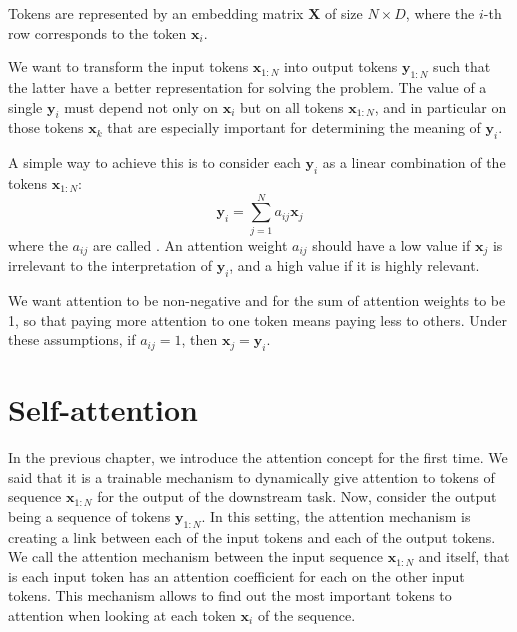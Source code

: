 Tokens are represented by an embedding matrix $\mathbf{X}$ of size $N \times D$, where the $i$-th row corresponds to the token $\mathbf{x}_{i}$.

We want to transform the input tokens $\mathbf{x}_{1:N}$ into output tokens $\mathbf{y}_{1:N}$ such that the latter have a better representation for solving the problem. The value of a single $\mathbf{y}_i$ must depend not only on $\mathbf{x}_i$ but on all tokens $\mathbf{x}_{1:N}$, and in particular on those tokens $\mathbf{x}_{k}$ that are especially important for determining the meaning of $\mathbf{y}_i$.

A simple way to achieve this is to consider each $\mathbf{y}_i$ as a linear combination of the tokens $\mathbf{x}_{1:N}$:
\[
\mathbf{y}_{i}=\sum^{N}_{j=1}a_{ij}\mathbf{x}_{j}
\]
where the $a_{ij}$ are called . An attention weight $a_{ij}$ should have a low value if $\mathbf{x}_{j}$ is irrelevant to the interpretation of $\mathbf{y}_i$, and a high value if it is highly relevant.

We want attention to be non-negative and for the sum of attention weights to be 1, so that paying more attention to one token means paying less to others.
Under these assumptions, if $a_{ij} = 1$, then $\mathbf{x}_j = \mathbf{y}_i$.

\section{Self-attention}
In the previous chapter, we introduce the attention concept for the first time. 
We said that it is a trainable mechanism to dynamically give attention to tokens of sequence \(\mathbf{x}_{1:N}\) for the output of the downstream task.
Now, consider the output being a sequence of tokens \(\mathbf{y}_{1:N}\). In this setting, the attention mechanism is creating a link between each of the input tokens and each of the output tokens.
We call  the attention mechanism between the input sequence \(\mathbf{x}_{1:N}\) and itself, that is each input token has an attention coefficient for each on the other input tokens.
This mechanism allows to find out the most important tokens to attention when looking at each token \(\mathbf{x}_i\) of the sequence.

